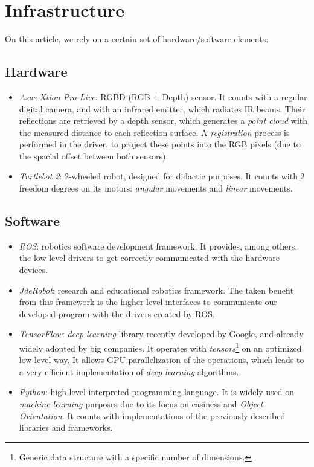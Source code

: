 \section{Infrastructure}

On this article, we rely on a certain set of hardware/software elements:

\subsection*{Hardware}

\begin{itemize}
	\item \emph{Asus Xtion Pro Live}: RGBD (RGB + Depth) sensor. It counts with a regular digital camera, and with an infrared emitter, which radiates IR beams. Their reflections are retrieved by a depth sensor, which generates a \emph{point cloud} with the measured distance to each reflection surface. A \emph{registration} process is performed in the driver, to project these points into the RGB pixels (due to the spacial offset between both sensors).\\
	
	\item \emph{Turtlebot 2}: 2-wheeled robot, designed for didactic purposes. It counts with 2 freedom degrees on its motors: \emph{angular} movements and \emph{linear} movements.\\
\end{itemize}

\subsection*{Software}

\begin{itemize}
	\item \emph{ROS}: robotics software development framework. It provides, among others, the low level drivers to get correctly communicated with the hardware devices.\\
	
	\item \emph{JdeRobot}: research and educational robotics framework. The taken benefit from this framework is the higher level interfaces to communicate our developed program with the drivers created by ROS.\\
	
	
	\item \emph{TensorFlow}: \emph{deep learning} library recently developed by Google, and already widely adopted by big companies. It operates with \emph{tensors}\footnote{Generic data structure with a specific number of dimensions.} on an optimized low-level way. It allows GPU parallelization of the operations, which leads to a very efficient implementation of \emph{deep learning} algorithms.\\
	
	
	\item \emph{Python}: high-level interpreted programming language. It is widely used on \emph{machine learning} purposes due to its focus on easiness and \emph{Object Orientation}. It counts with implementations of the previously described libraries and frameworks.\\
\end{itemize}